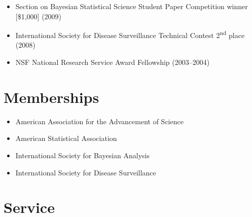 \documentclass[overlapped,line]{res}
\begin{document}
\begin{resume}
\begin{itemize}
\item Section on Bayesian Statistical Science Student Paper Competition winner [\$1,000] (2009)
\item International Society for Disease Surveillance Technical Contest 2\textsuperscript{nd} place (2008)
\item NSF National Research Service Award Fellowship (2003--2004)
\end{itemize}



\section{\bf Memberships}
\begin{itemize}
\item American Association for the Advancement of Science
\item American Statistical Association
\item International Society for Bayesian Analysis
\item International Society for Disease Surveillance
\end{itemize}

\section{\bf Service}


\end{resume}
\end{document}
